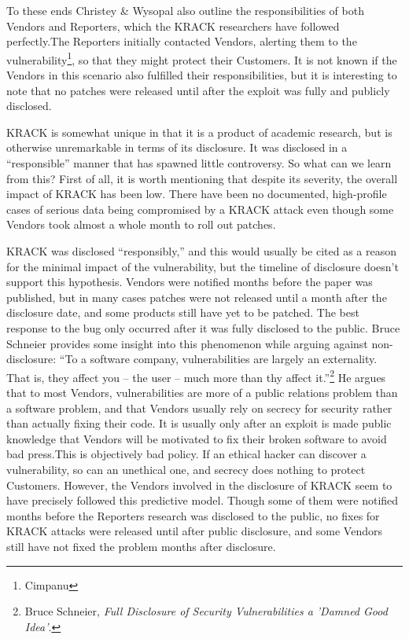 \documentclass[12pt]{article}
\begin{document}
\begin{doublespace}
To these ends Christey \& Wysopal also outline the responsibilities of both
Vendors and Reporters, which the KRACK researchers have followed perfectly.\footnotemark[6]
The Reporters initially contacted Vendors, alerting them to the
vulnerability\footnote{Cimpanu}, so that they might protect their Customers.
It is not known if the Vendors in this scenario also fulfilled their
responsibilities, but it is interesting to note that no patches were released
until after the exploit was fully and publicly disclosed.

KRACK is somewhat unique in that it is a product of academic research, but is
otherwise unremarkable in terms of its disclosure. It
was disclosed in a ``responsible'' manner that has spawned little controversy.
So what can we learn from this? First of all, it is worth
mentioning that despite its severity, the overall impact of KRACK has been low.
There have been no documented, high-profile cases of serious data being
compromised by a KRACK attack even though some Vendors took
almost a whole month to roll out patches.

KRACK was disclosed ``responsibly,'' and this would usually be cited as a
reason for the minimal impact of the vulnerability, but the timeline of
disclosure doesn't support this hypothesis. Vendors
were notified months before the paper was published, but in many cases patches
were not released until a month after the disclosure date, and some products
still have yet to be patched. The best response to the bug only occurred after
it was fully disclosed to the public. Bruce Schneier provides some insight
into this phenomenon while arguing against non-disclosure: ``To a software
company, vulnerabilities are largely an externality. That is, they affect
you -- the user -- much more than thy affect it.''\footnote{Bruce Schneier, \textit{Full Disclosure of Security Vulnerabilities a 'Damned Good Idea'}.}
He argues that to most Vendors, vulnerabilities are more of a public relations
problem than a software problem, and that Vendors usually rely on secrecy
for security rather than actually fixing their code. It is usually only after
an exploit is made public knowledge that Vendors will be motivated to fix their
broken software to avoid bad press.\footnotemark[8] This is objectively bad
policy. If an ethical hacker can discover a vulnerability, so can an unethical
one, and secrecy does nothing to protect Customers. However, the Vendors
involved in the disclosure of KRACK seem to have precisely followed this
predictive model. Though some of them were notified months before the Reporters
research was disclosed to the public, no fixes for KRACK attacks were released
until after public disclosure, and some Vendors still have not fixed the
problem months after disclosure.


\end{doublespace}
\end{document}
